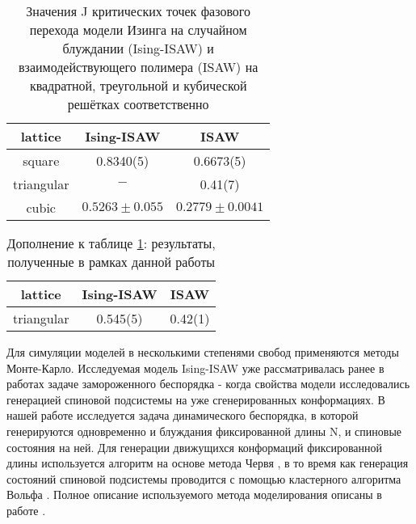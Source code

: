 \begin{table}[h!]
    \centering
    \begin{tabular}{|c|c|c|}
        \hline
        lattice & Ising-ISAW & ISAW \\ \hline
        square & 0.8340(5)\cite{faizullina2021critical} &  0.6673(5)\cite{caracciolo2011geometrical} \\ \hline
        triangular & $-$ & 0.41(7) \cite{Privman1986}\\ \hline
        cubic & $0.5263 \pm 0.055$\cite{foster2021critical} & $0.2779 \pm 0.0041$\cite{Tesi1996} \\ \hline
    \end{tabular}
    \caption{Значения J критических точек фазового перехода модели Изинга на случайном блуждании (Ising-ISAW) и взаимодействующего полимера (ISAW) 
		на квадратной, треугольной и кубической решётках соответственно}
    \label{tab:crits}
\end{table}

\begin{table}[h!]
    \centering
    \begin{tabular}{|c|c|c|}
        \hline
        lattice & Ising-ISAW & ISAW \\ \hline
        triangular & 0.545(5) & 0.42(1)\\ \hline
    \end{tabular}
    \caption{Дополнение к таблице \ref{tab:crits}: результаты, полученные в рамках данной работы}
    \label{tab:res_crits}
\end{table}

Для симуляции моделей в несколькими степенями свобод применяются методы Монте-Карло.
Исследуемая модель Ising-ISAW уже рассматривалась ранее в работах \cite{Garel1999, Papale2018} задаче замороженного беспорядка - когда свойства модели исследовались генерацией спиновой подсистемы на уже сгенерированных конформациях.
В нашей работе исследуется задача динамического беспорядка, в которой генерируются одновременно и блуждания фиксированной длины N, и спиновые состояния на ней.
Для генерации движущихся конформаций фиксированной длины используется алгоритм на основе метода Червя \cite{Worm}, 
в то время как генерация состояний спиновой подсистемы проводится с помощью кластерного алгоритма Вольфа \cite{Wolff}.
Полное описание используемого метода моделирования описаны в работе \cite{faizullina2021critical}.
